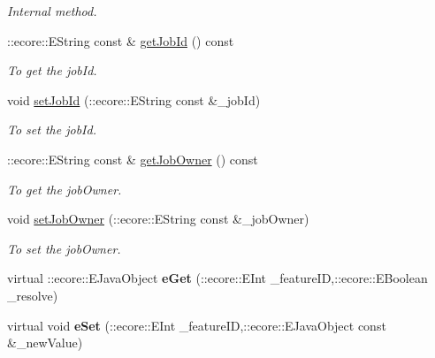 \begin{DoxyCompactItemize}
\begin{DoxyCompactList}\small\item\em Internal method. \item\end{DoxyCompactList}\item 
::ecore::EString const \& \hyperlink{classTMS__Data_1_1ProgressOptions_adbfb1a75df3fea6178a2dd4106b36b3f}{getJobId} () const 
\begin{DoxyCompactList}\small\item\em To get the jobId. \item\end{DoxyCompactList}\item 
void \hyperlink{classTMS__Data_1_1ProgressOptions_a21351a08ed9c5688709d39532dd6cc72}{setJobId} (::ecore::EString const \&\_\-jobId)
\begin{DoxyCompactList}\small\item\em To set the jobId. \item\end{DoxyCompactList}\item 
::ecore::EString const \& \hyperlink{classTMS__Data_1_1ProgressOptions_a6f21512a1e09d635a0afa37b0a199555}{getJobOwner} () const 
\begin{DoxyCompactList}\small\item\em To get the jobOwner. \item\end{DoxyCompactList}\item 
void \hyperlink{classTMS__Data_1_1ProgressOptions_a69ff1d5768f20b4067c8922b39df8fe7}{setJobOwner} (::ecore::EString const \&\_\-jobOwner)
\begin{DoxyCompactList}\small\item\em To set the jobOwner. \item\end{DoxyCompactList}\item 
\hypertarget{classTMS__Data_1_1ProgressOptions_aed1964e97a4f2a03b4eac22e915c20ec}{
virtual ::ecore::EJavaObject {\bfseries eGet} (::ecore::EInt \_\-featureID,::ecore::EBoolean \_\-resolve)}
\label{classTMS__Data_1_1ProgressOptions_aed1964e97a4f2a03b4eac22e915c20ec}

\item 
\hypertarget{classTMS__Data_1_1ProgressOptions_a33a8e2ffdca1e8ac60206e19dfe1937f}{
virtual void {\bfseries eSet} (::ecore::EInt \_\-featureID,::ecore::EJavaObject const \&\_\-newValue)}
\label{classTMS__Data_1_1ProgressOptions_a33a8e2ffdca1e8ac60206e19dfe1937f}


\end{DoxyCompactItemize}
